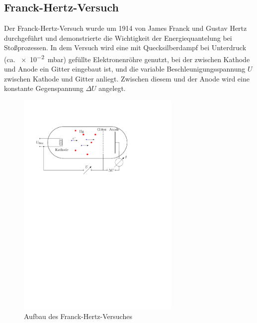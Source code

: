 \documentclass[11pt, a4paper]{article}
\begin{document}
\subsection{Franck-Hertz-Versuch}

Der Franck-Hertz-Versuch wurde um 1914 von James Franck und Gustav Hertz \cite{demtroeder3} durchgeführt und demonstrierte die Wichtigkeit der Energiequantelung bei Stoßprozessen.
In dem Versuch wird eine mit Quecksilberdampf bei Unterdruck (ca. \SI{e-2}{\milli\bar}) gefüllte Elektronenröhre genutzt, bei der zwischen Kathode und Anode ein Gitter eingebaut ist, und die variable Beschleunigungsspannung $U$ zwischen Kathode und Gitter anliegt.
Zwischen diesem und der Anode wird eine konstante Gegenspannung $\Delta U$ angelegt.

\begin{figure}[h]
\centering
\includegraphics[width=0.7\textwidth]{./figures/franck-hertz_aufbau.pdf}
\caption{Aufbau des Franck-Hertz-Versuches}
\label{fig:franck-hertz_aufbau}
\end{figure}
\end{document}
